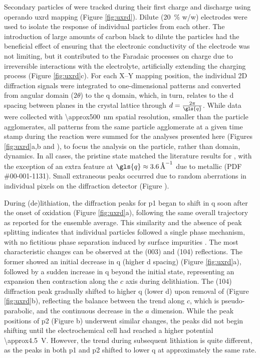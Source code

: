 \documentclass{article}
\begin{document}
Secondary particles of \nca{} were tracked during their first charge
and discharge using operando \gls{uxrd} mapping (Figure
\ref{fig:uxrd}). Dilute (\SI{20}{\percent} w/w) \nca{} electrodes were
used to isolate the response of individual particles from each
other. The introduction of large amounts of carbon black to dilute the
particles had the beneficial effect of ensuring that the electronic
conductivity of the electrode was not limiting, but it contributed to
the Faradaic processes on charge due to irreversible interactions with
the electrolyte\cite{kostecki2014}, artificially extending the
charging process (Figure \ref{fig:uxrd}c). For each X--Y mapping
position, the individual 2D diffraction signals were integrated to
one-dimensional patterns and converted from angular domain ($2\theta$)
to the \gls{q} domain, which, in turn, relates to the d spacing
between planes in the crystal lattice through
$d=\frac{2\pi}{\gls{q}}$. While data were collected with
\SI{\approx500}{\nano\meter} spatial resolution, smaller than the
particle agglomerates, all patterns from the same particle agglomerate
at a given time stamp during the reaction were summed for the analyses
presented here (Figures \ref{fig:uxrd}a,b and
), to focus the analysis on the particle,
rather than domain, dynamics. In all cases, the pristine state matched
the literature results for \nca{} \cite{novak2015}, with the exception
of an extra feature at $\gls{q}\approx\SI{3.6}{\per\angstrom}$ due to
metallic  (PDF \#00-001-1131). Small extraneous peaks occurred
due to random aberrations in individual pixels on the diffraction
detector (Figure ).

During (de)lithiation, the diffraction peaks for \gls{p1} began to
shift in \gls{q} soon after the onset of oxidation (Figure
\ref{fig:uxrd}a), following the same overall trajectory as reported
for the ensemble average\cite{robert2015}. This similarity and the
absence of peak splitting indicates that individual particles followed
a single phase mechanism, with no fictitious phase separation induced
by surface impurities \cite{grenier2017}. The most characteristic
changes can be observed at the (003) and (104) reflections. The former
showed an initial decrease in \gls{q} (higher d spacing) (Figure
\ref{fig:uxrd}a), followed by a sudden increase in \gls{q} beyond the
initial state, representing an expansion then contraction along the
$c$ axis during delithiation\cite{robert2015}. The (104) diffraction
peak gradually shifted to higher \gls{q} (lower d) upon removal of
 (Figure \ref{fig:uxrd}b), reflecting the balance between the
trend along $c$, which is pseudo-parabolic, and the continuous
decrease in the $a$ dimension.\cite{robert2015} While the peak
positions of \gls{p2} (Figure b) underwent
similar changes, the peaks did not begin shifting until the
electrochemical cell had reached a higher potential
\SI{\approx4.5}{\volt}. However, the trend during subsequent
lithiation is quite different, as the peaks in both \gls{p1} and
\gls{p2} shifted to lower \gls{q} at approximately the same rate.
\end{document}
